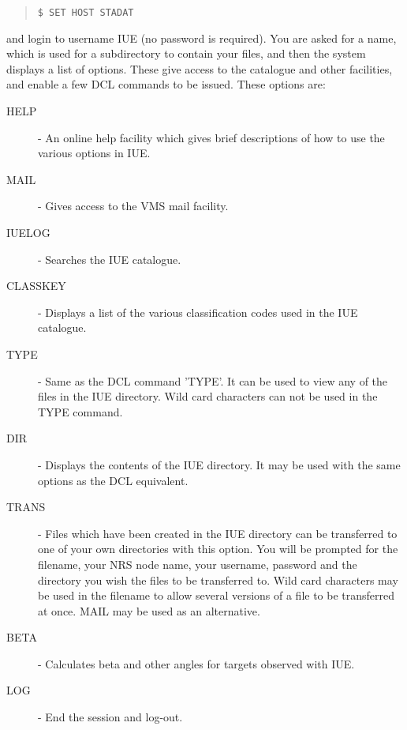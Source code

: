 \begin{quote}
{\tt \$ SET HOST STADAT}
\end{quote}

and login to username IUE (no password is required).
You are asked for a name, which is used for a subdirectory to contain your 
files, and then the system displays a list of options. These give access to the 
catalogue and other 
facilities, and enable a few DCL commands to be issued.
These options are:

\begin{description}
\begin{description}
\item [HELP] - An online help facility which gives brief descriptions of how
to use the various options in IUE.

\item [MAIL] - Gives access to the VMS mail facility.

\item [IUELOG] - Searches the IUE catalogue.

\item [CLASSKEY] - Displays a list of the various classification codes used in the
IUE catalogue.

\item [TYPE] - Same as the DCL command 'TYPE'.
It can be used to view any of the files in the IUE directory. 
Wild card characters can not be used in the TYPE command.

\item [DIR] - Displays the contents of the IUE directory.
It may be used with the same options as the DCL equivalent.

\item [TRANS] - Files which have been created in the IUE directory can be
transferred to one of your own directories with this option.
You will be prompted for the filename, your NRS node name, your username, 
password and the directory
you wish the files to be transferred to.
Wild card characters may be used in the filename to allow several versions of
a file to be transferred at once. MAIL may be used as an alternative.

\item [BETA] - Calculates beta and other angles for targets observed with IUE.

\item [LOG] - End the session and log-out.

\end{description}
\end{description}

